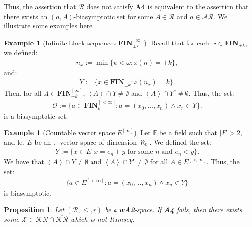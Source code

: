 \documentclass[11pt,reqno]{amsart}
\theoremstyle{plain}
\numberwithin{equation}{section}
\newtheorem{proposition}[theorem]{Proposition}
\theoremstyle{definition}
\newtheorem{example}[theorem]{Example}
\renewcommand{\c}[1]{\left\langle #1 \right\rangle}
\renewcommand{\bar}[1]{\overline{#1}}
\newcommand{\cal}{\mathcal}
\renewcommand{\bf}{\mathbf}
\newcommand{\bcal}[1]{\bm{\mathcal{#1}}}
\newcommand{\FIN}{\bf{FIN}}
\newcommand{\X}{\cal{X}}
\renewcommand{\O}{\cal{O}}
\begin{document}
Thus, the assertion that $\cal{R}$ does not satisfy \textbf{A4} is equivalent to the assertion that there exists an $(a,A)$-biasymptotic set for some $A \in \cal{R}$ and $a \in \cal{AR}$. We illustrate some examples here. 

\begin{example}[Infinite block sequences $\FIN_{\pm k}^{[\infty]}$]
    Recall that for each $x \in \FIN_{\pm k}$, we defined:
    \begin{align*}
        n_x := \min\{n < \omega : x(n) = \pm k\},
    \end{align*}
    and:
    \begin{align*}
        Y := \{x \in \FIN_{\pm k} : x(n_x) = k\}.
    \end{align*}
    Then, for all $A \in \FIN_{\pm k}^{[\infty]}$, $\c{A} \cap Y \neq \emptyset$ and $\c{A} \cap Y^c \neq \emptyset$. Thus, the set:
    \begin{align*}
        \O := \{a \in \FIN_k^{[<\infty]} : a = (x_0,\dots,x_n) \wedge x_n \in Y\}.
    \end{align*}
    is a biasymptotic set.
\end{example}

\begin{example}[Countable vector space $E^{[\infty]}$]
\label{ex:biasymptotic.set.vector.spaces}
    Let $\mathbb{F}$ be a field such that $|F| > 2$, and let $E$ be an $\mathbb{F}$-vector space of dimension $\aleph_0$. We defined the set:
    \begin{align*}
        Y := \{x \in E : \text{$x = e_n + y$ for some $n$ and $e_n < y$}\}.
    \end{align*}
    We have that $\c{A} \cap Y \neq \emptyset$ and $\c{A} \cap Y^c \neq \emptyset$ for all $A \in E^{[<\infty]}$. Thus, the set:
    \begin{align*}
        \{a \in E^{[<\infty]} : a = (x_0,\dots,x_n) \wedge x_n \in Y\}
    \end{align*}
    is biasymptotic.
\end{example}

\begin{proposition}
    Let $(\cal{R},\leq,r)$ be a \textbf{wA2}-space. If \textbf{A4} fails, then there exists some $\X \in \bcal{KR} \cap \bar{\bcal{KR}}$ which is not Ramsey.
\end{proposition}
\end{document}
